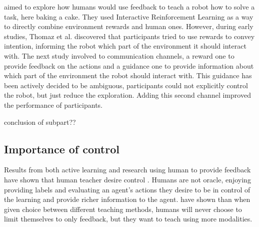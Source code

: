 \cite{thomaz2008teachable} aimed to explore how humans would use feedback to teach a robot how to solve a task,  here baking a cake. They used Interactive Reinforcement Learning as a way to directly combine environment rewards and human ones. However, during early studies, Thomaz et al. discovered that participants tried to use rewards to convey intention, informing the robot which part of the environment it should interact with. The next study involved to communication channels, a reward one to provide feedback on the actions and a guidance one to provide information about which part of the environment the robot should interact with. This guidance has been actively decided to be ambiguous, participants could not explicitly control the robot, but just reduce the exploration. Adding this second channel improved the performance of participants.




conclusion of subpart??
\subsection{Importance of control}

Results from both active learning and research using human to provide feedback have shown that human teacher desire control \citep{amershi2014power}. Humans are not oracle, enjoying providing labels and evaluating an agent's actions they desire to be in control of the learning and provide richer information to the agent. \cite{kaochar2011towards} have shown than when given choice between different teaching methods, humans will never choose to limit themselves to only feedback, but they want to teach using more modalities.

